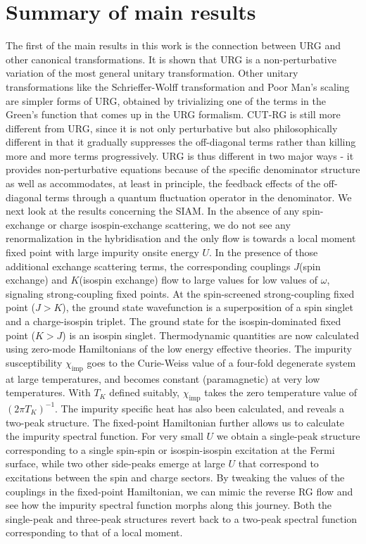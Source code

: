 \documentclass[12pt,twoside]{report}
\numberwithin{equation}{section}
\begin{document}
\section{Summary of main results}
The first of the main results in this work is the connection between URG and other canonical transformations. It is shown that URG is a non-perturbative variation of the most general unitary transformation. Other unitary transformations like the Schrieffer-Wolff transformation and Poor Man's scaling are simpler forms of URG, obtained by trivializing one of the terms in the Green's function that comes up in the URG formalism. CUT-RG is still more different from URG, since it is not only perturbative but also philosophically different in that it gradually suppresses the off-diagonal terms rather than killing more and more terms progressively. URG is thus different in two major ways - it provides non-perturbative equations because of the specific denominator structure as well as accommodates, at least in principle, the feedback effects of the off-diagonal terms through a quantum fluctuation operator in the denominator.
\pb We next look at the results concerning the SIAM. In the absence of any spin-exchange or charge isospin-exchange scattering, we do not see any renormalization in the hybridisation and the only flow is towards a local moment fixed point with large impurity onsite energy \(U\). In the presence of those additional exchange scattering terms, the corresponding couplings \(J\)(spin exchange) and \(K\)(isospin exchange) flow to large values for low values of \(\omega\), signaling strong-coupling fixed points.
\pb At the spin-screened strong-coupling fixed point (\(J>K\)), the ground state wavefunction is a superposition of a spin singlet and a charge-isospin triplet. The ground state for the isospin-dominated fixed point (\(K>J\)) is an isospin singlet. Thermodynamic quantities are now calculated using zero-mode Hamiltonians of the low energy effective theories. The impurity susceptibility \(\chi_\text{imp}\) goes to the Curie-Weiss value of a four-fold degenerate system at large temperatures, and becomes constant (paramagnetic) at very low temperatures. With \(T_K\) defined suitably, \(\chi_\text{imp}\) takes the zero temperature value of \(\left( 2\pi T_K \right) ^{-1}\). The impurity specific heat has also been calculated, and reveals a two-peak structure.
\pb The fixed-point Hamiltonian further allows us to calculate the impurity spectral function. For very small \(U\) we obtain a single-peak structure corresponding to a single spin-spin or isospin-isospin excitation at the Fermi surface, while two other side-peaks emerge at large \(U\) that correspond to excitations between the spin and charge sectors. By tweaking the values of the couplings in the fixed-point Hamiltonian, we can mimic the reverse RG flow and see how the impurity spectral function morphs along this journey. Both the single-peak and three-peak structures revert back to a two-peak spectral function corresponding to that of a local moment.
\end{document}
